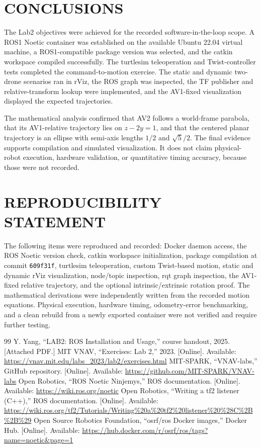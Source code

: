 \documentclass[letterpaper, 10 pt, conference]{ieeeconf}
\begin{document}
\balance
\section{CONCLUSIONS}
\label{sec:conclusion}
The Lab2 objectives were achieved for the recorded software-in-the-loop scope. A ROS1 Noetic container was established on the available Ubuntu 22.04 virtual machine, a ROS1-compatible package version was selected, and the catkin workspace compiled successfully. The turtlesim teleoperation and Twist-controller tests completed the command-to-motion exercise. The static and dynamic two-drone scenarios ran in rViz, the ROS graph was inspected, the TF publisher and relative-transform lookup were implemented, and the AV1-fixed visualization displayed the expected trajectories.

The mathematical analysis confirmed that AV2 follows a world-frame parabola, that its AV1-relative trajectory lies on \(z-2y=1\), and that the centered planar trajectory is an ellipse with semi-axis lengths \(1/2\) and \(\sqrt{5}/2\). The final evidence supports compilation and simulated visualization. It does not claim physical-robot execution, hardware validation, or quantitative timing accuracy, because those were not recorded.

\section*{REPRODUCIBILITY STATEMENT}
The following items were reproduced and recorded: Docker daemon access, the ROS Noetic version check, catkin workspace initialization, package compilation at commit \texttt{609f31f}, turtlesim teleoperation, custom Twist-based motion, static and dynamic rViz visualization, node/topic inspection, rqt graph inspection, the AV1-fixed relative trajectory, and the optional intrinsic/extrinsic rotation proof. The mathematical derivations were independently written from the recorded motion equations. Physical execution, hardware timing, odometry-error benchmarking, and a clean rebuild from a newly exported container were not verified and require further testing.

\begin{thebibliography}{99}
 Y. Yang, ``LAB2: ROS Installation and Usage,'' course handout, 2025. [Attached PDF.]
 MIT VNAV, ``Exercises: Lab 2,'' 2023. [Online]. Available: \url{https://vnav.mit.edu/labs_2023/lab2/exercises.html}
 MIT-SPARK, ``VNAV-labs,'' GitHub repository. [Online]. Available: \url{https://github.com/MIT-SPARK/VNAV-labs}
 Open Robotics, ``ROS Noetic Ninjemys,'' ROS documentation. [Online]. Available: \url{https://wiki.ros.org/noetic}
 Open Robotics, ``Writing a tf2 listener (C++),'' ROS documentation. [Online]. Available: \url{https://wiki.ros.org/tf2/Tutorials/Writing%20a%20tf2%20listener%20%28C%2B%2B%29}
 Open Source Robotics Foundation, ``osrf/ros Docker images,'' Docker Hub. [Online]. Available: \url{https://hub.docker.com/r/osrf/ros/tags?name=noetic&page=1}
\end{thebibliography}
\end{document}
